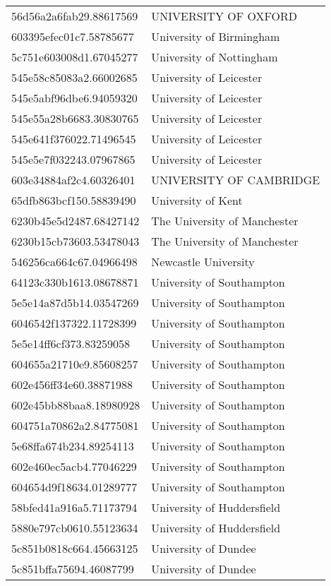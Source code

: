 \begin{tabular}{ll}
56d56a2a6fab29.88617569 & UNIVERSITY OF OXFORD \\
603395efec01c7.58785677 & University of Birmingham \\
5c751e603008d1.67045277 & University of Nottingham \\
545e58c85083a2.66002685 & University of Leicester \\
545e5abf96dbe6.94059320 & University of Leicester \\
545e55a28b6683.30830765 & University of Leicester \\
545e641f376022.71496545 & University of Leicester \\
545e5e7f032243.07967865 & University of Leicester \\
603e34884af2c4.60326401 & UNIVERSITY OF CAMBRIDGE \\
65dfb863bcf150.58839490 & University of Kent \\
6230b45e5d2487.68427142 & The University of Manchester \\
6230b15cb73603.53478043 & The University of Manchester \\
546256ca664c67.04966498 & Newcastle University \\
64123c330b1613.08678871 & University of Southampton \\
5e5e14a87d5b14.03547269 & University of Southampton \\
6046542f137322.11728399 & University of Southampton \\
5e5e14ff6cf373.83259058 & University of Southampton \\
604655a21710e9.85608257 & University of Southampton \\
602e456ff34e60.38871988 & University of Southampton \\
602e45bb88baa8.18980928 & University of Southampton \\
604751a70862a2.84775081 & University of Southampton \\
5e68ffa674b234.89254113 & University of Southampton \\
602e460ec5acb4.77046229 & University of Southampton \\
604654d9f18634.01289777 & University of Southampton \\
58bfed41a916a5.71173794 & University of Huddersfield \\
5880e797cb0610.55123634 & University of Huddersfield \\
5c851b0818c664.45663125 & University of Dundee \\
5c851bffa75694.46087799 & University of Dundee \\

\end{tabular}
